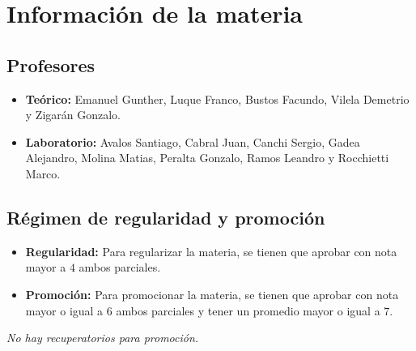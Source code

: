 \documentclass{article}
\begin{document}

\clearpage
\newpage
\thispagestyle{empty}
\section*{Información de la materia}
\subsection*{Profesores}
\begin{itemize}
    \item \textbf{Teórico:} Emanuel Gunther, Luque Franco, Bustos Facundo, Vilela Demetrio y Zigarán Gonzalo.
    \item \textbf{Laboratorio:} Avalos Santiago, Cabral Juan, Canchi Sergio, Gadea Alejandro, Molina Matias, Peralta Gonzalo, Ramos Leandro y Rocchietti Marco.
\end{itemize}
\subsection*{Régimen de regularidad y promoción}
\begin{itemize}
    \item \textbf{Regularidad:} Para regularizar la materia, se tienen que aprobar con nota mayor a $4$ ambos parciales.
    \item \textbf{Promoción:} Para promocionar la materia, se tienen que aprobar con nota mayor o igual a $6$ ambos parciales y tener un promedio mayor o igual a $7$.
\end{itemize}
\textit{No hay recuperatorios para promoción.}
\end{document}
